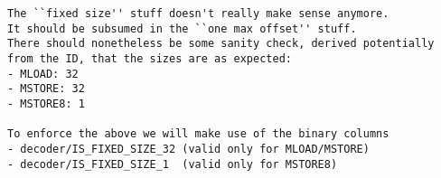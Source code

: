 

\saNote{}
\begin{verbatim}
The ``fixed size'' stuff doesn't really make sense anymore.
It should be subsumed in the ``one max offset'' stuff.
There should nonetheless be some sanity check, derived potentially from the ID, that the sizes are as expected:
- MLOAD: 32
- MSTORE: 32
- MSTORE8: 1

To enforce the above we will make use of the binary columns
- decoder/IS_FIXED_SIZE_32 (valid only for MLOAD/MSTORE)
- decoder/IS_FIXED_SIZE_1  (valid only for MSTORE8)
\end{verbatim}

